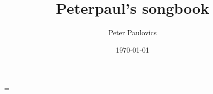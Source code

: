 \documentclass[a4paper,landscape]{article}
\begin{document}
\versesep=\baselineskip


\title{Peterpaul's songbook}
\author{Peter Paulovics}
\date{\today}
\maketitle
\newpage

\tableofcontents
\newpage


\begin{songs}{}



\end{songs}
\end{document}
